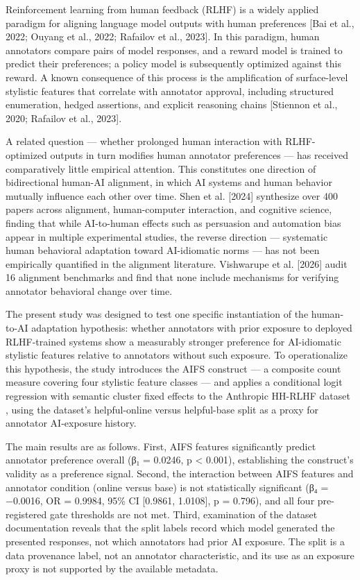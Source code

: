 
Reinforcement learning from human feedback (RLHF) is a widely applied paradigm for aligning language model outputs with human preferences [Bai et al., 2022; Ouyang et al., 2022; Rafailov et al., 2023]. In this paradigm, human annotators compare pairs of model responses, and a reward model is trained to predict their preferences; a policy model is subsequently optimized against this reward. A known consequence of this process is the amplification of surface-level stylistic features that correlate with annotator approval, including structured enumeration, hedged assertions, and explicit reasoning chains [Stiennon et al., 2020; Rafailov et al., 2023].

A related question — whether prolonged human interaction with RLHF-optimized outputs in turn modifies human annotator preferences — has received comparatively little empirical attention. This constitutes one direction of bidirectional human-AI alignment, in which AI systems and human behavior mutually influence each other over time. Shen et al. [2024] synthesize over 400 papers across alignment, human-computer interaction, and cognitive science, finding that while AI-to-human effects such as persuasion and automation bias appear in multiple experimental studies, the reverse direction — systematic human behavioral adaptation toward AI-idiomatic norms — has not been empirically quantified in the alignment literature. Vishwarupe et al. [2026] audit 16 alignment benchmarks and find that none include mechanisms for verifying annotator behavioral change over time.

The present study was designed to test one specific instantiation of the human-to-AI adaptation hypothesis: whether annotators with prior exposure to deployed RLHF-trained systems show a measurably stronger preference for AI-idiomatic stylistic features relative to annotators without such exposure. To operationalize this hypothesis, the study introduces the AIFS construct — a composite count measure covering four stylistic feature classes — and applies a conditional logit regression with semantic cluster fixed effects to the Anthropic HH-RLHF dataset \citep{Baietal2022}, using the dataset's helpful-online versus helpful-base split as a proxy for annotator AI-exposure history.

The main results are as follows. First, AIFS features significantly predict annotator preference overall (β₁ = 0.0246, p < 0.001), establishing the construct's validity as a preference signal. Second, the interaction between AIFS features and annotator condition (online versus base) is not statistically significant (β₄ = −0.0016, OR = 0.9984, 95\% CI [0.9861, 1.0108], p = 0.796), and all four pre-registered gate thresholds are not met. Third, examination of the dataset documentation reveals that the split labels record which model generated the presented responses, not which annotators had prior AI exposure. The split is a data provenance label, not an annotator characteristic, and its use as an exposure proxy is not supported by the available metadata.


